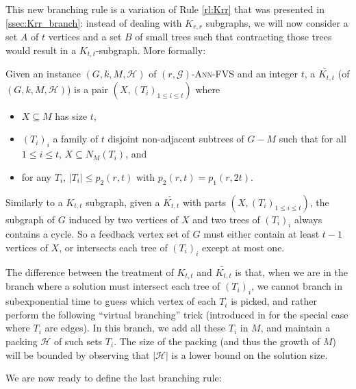 \documentclass{amsart}
\newcommand{\G}{\mathcal{G}}
\newcommand{\mH}{\mathcal{H}}
\newcommand{\KttTilde}{\widetilde{K_{t,t}}}
\newcommand{\AFVS}{\textsc{$(r,\G)$-Ann-FVS}\xspace}
\newcommand{\ruleref}[1]{\hyperref[#1]{\ref*{#1}}}
\begin{document}
This new branching rule is a variation of Rule \ruleref{rl:Krr} that was presented in \autoref{ssec:Krr_branch}: instead of dealing with $K_{r,r}$ subgraphs, we will now consider a set $A$ of $t$ vertices and a set $B$ of small trees such that contracting those trees would result in a $K_{t,t}$-subgraph. More formally:
\begin{definition}
Given an instance $(G,k,M,\mH)$ of \AFVS and an integer $t$, a $\KttTilde$ (of $(G,k,M,\mH)$) is a pair $\left(X, (T_i)_{1\leq i \leq t}\right)$ where
\begin{itemize}
    \item $X\subseteq M$ has size $t$, 
    \item  $(T_i)_i$ a family of $t$ disjoint non-adjacent subtrees of $G - M$ such that for all $1\leq i \leq t$, $X\subseteq N_M(T_i)$, and
    \item for any $T_i$, $|T_i| \le p_2(r,t)$ with $p_2(r,t)=p_1(r,2t)$.
\end{itemize}
\end{definition}



\begin{remark}\label{rmk:Ktttilde}
  Similarly to a $K_{t,t}$ subgraph, given a $\KttTilde$ with parts $(X, (T_i)_{1\leq i \leq t})$, the subgraph of $G$ induced by two vertices of $X$ and two trees of $(T_i)_i$ always contains a cycle. So a feedback vertex set of $G$ must either contain at least $t-1$ vertices of $X$, or intersects each tree of $(T_i)_i$ except at most one. 
\end{remark}
  
  
The difference between the treatment of $K_{t,t}$ and $\KttTilde$ is that, when we are in the branch where a solution must intersect each tree of $(T_i)_i$, we cannot branch in subexponential time to guess which vertex of each $T_i$ is picked, and rather perform the following ``virtual branching'' trick (introduced in \cite{lokSODA22} for the special case where $T_i$ are edges). In this branch, we add all these $T_i$ in $M$, and maintain a packing $\mH$ of such sets $T_i$. The size of the packing (and thus the growth of $M$) will be bounded by observing that $|\mH|$ is a lower bound on the solution size. 

We are now ready to define the last branching rule:
\end{document}
